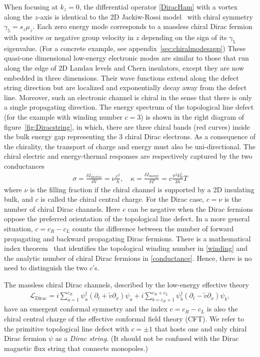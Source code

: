 When focusing at $k_z=0$, the differential operator \eqref{DiracHam} with a vortex along the $z$-axis is identical to the 2D Jackiw-Rossi model~\cite{JackiwRossi81} with chiral symmetry $\gamma_5=s_z\mu_z$. Each zero energy mode corresponds to a massless chiral Dirac fermion with positive or negative group velocity in $z$ depending on the sign of its $\gamma_5$ eigenvalue. (For a concrete example, see appendix~\ref{sec:chiralmodesapp}) These quasi-one dimensional low-energy electronic modes are similar to those that run along the edge of 2D Landau levels and Chern insulators, except they are now embedded in three dimensions. Their wave functions extend along the defect string direction but are localized and exponentially decay away from the defect line. Moreover, such an electronic channel is chiral in the sense that there is only a single propagating direction. The energy spectrum of the topological line defect (for the example with winding number $c=3$) is shown in the right diagram of figure~\ref{fig:Diracstring}, in which, there are three chiral bands (red curves) inside the bulk energy gap representing the 3 chiral Dirac electrons. As a consequence of the chirality, the transport of charge and energy must also be uni-directional. The chiral electric and energy-thermal responses are respectively captured by the two conductances \begin{align}\sigma=\frac{\delta I_{\mathrm{electric}}}{\delta V}=\nu\frac{e^2}{h},\quad\kappa=\frac{\delta I_{\mathrm{energy}}}{\delta T}=c\frac{\pi^2k_B^2}{3h}T\label{conductance}\end{align} where $\nu$ is the filling fraction if the chiral channel is supported by a 2D insulating bulk, and $c$ is called the chiral central charge. For the Dirac case, $c=\nu$ is the number of chiral Dirac channels. Here $c$ can be negative when the Dirac fermions oppose the preferred orientation of the topological line defect. In a more general situation, $c=c_R-c_L$ counts the difference between the number of forward propagating and backward propagating Dirac fermions. There is a mathematical index theorem~\cite{TeoKane,AtiyahSinger63,Nakaharabook} that identifies the topological winding number in \eqref{winding} and the analytic number of chiral Dirac fermions in \eqref{conductance}. Hence, there is no need to distinguish the two $c$'s. 

The massless chiral Dirac channels, described by the low-energy effective theory \begin{align}\mathcal{L}_{\mathrm{Dirac}}=i\sum_{a=1}^{c_R}\psi^\dagger_a(\partial_t+\tilde{v}\partial_x)\psi_a+i\sum_{b=c_R+1}^{c_R+c_L}\psi^\dagger_b(\partial_t-\tilde{v}\partial_x)\psi_b,\end{align} have an emergent conformal symmetry and the index $c=c_R-c_L$ is also the chiral central charge of the effective conformal field theory (\hypertarget{CFT}{CFT}). We refer to the primitive topological line defect with $c=\pm1$ that hosts one and only chiral Dirac fermion $\psi$ as a {\em Dirac string}. (It should not be confused with the Dirac magnetic flux string that connects monopoles.)

